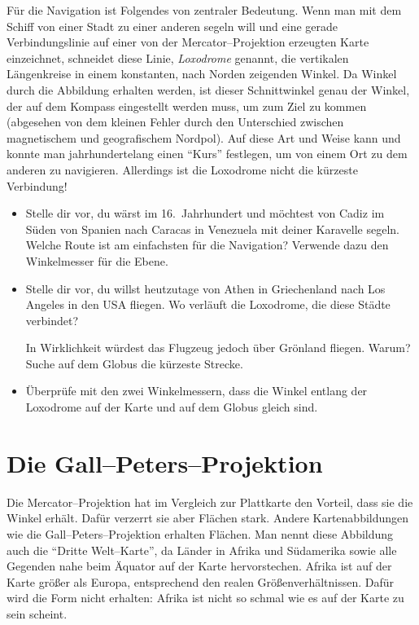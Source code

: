 \documentclass[a4paper,12pt]{article}
\begin{document}
Für die Navigation ist Folgendes von zentraler Bedeutung. Wenn man mit dem Schiff von 
einer Stadt zu einer anderen segeln will und eine gerade Verbindungslinie auf einer 
von der Mercator--Projektion erzeugten Karte einzeichnet, schneidet diese Linie, 
\emph{Loxodrome} genannt, die vertikalen Längenkreise in einem konstanten, nach Norden 
zeigenden Winkel. Da Winkel durch die Abbildung erhalten werden, ist dieser Schnittwinkel 
genau der Winkel, der auf dem Kompass eingestellt werden muss, um zum Ziel zu kommen
(abgesehen von dem kleinen Fehler durch den Unterschied zwischen magnetischem und 
geografischem Nordpol). Auf diese Art und Weise kann und konnte man jahrhundertelang 
einen "`Kurs"' festlegen, um von einem Ort zu dem anderen zu navigieren. Allerdings ist 
die Loxodrome nicht die kürzeste Verbindung!

\begin{itemize}
 \item Stelle dir vor, du wärst im 16.\ Jahrhundert und möchtest von Cadiz im Süden 
       von Spanien nach Caracas in Venezuela mit deiner Karavelle segeln. Welche 
       Route ist am einfachsten für die Navigation? Verwende dazu den Winkelmesser 
       für die Ebene.

 \item Stelle dir vor, du willst heutzutage von Athen in Griechenland nach Los Angeles 
       in den USA fliegen. Wo verläuft die Loxodrome, die diese Städte verbindet?

       In Wirklichkeit würdest das Flugzeug jedoch über Grönland fliegen. Warum? 
       Suche auf dem Globus die kürzeste Strecke.

 \item Überprüfe mit den zwei Winkelmessern, dass die Winkel entlang der Loxodrome 
       auf der Karte und auf dem Globus gleich sind.
\end{itemize}



\newpage
\section{Die Gall--Peters--Projektion}
\label{sec-gall}

Die Mercator--Projektion hat im Vergleich zur Plattkarte den Vorteil, dass sie die 
Winkel erhält. Dafür verzerrt sie aber Flächen stark. Andere Kartenabbildungen wie die
Gall--Peters--Projektion erhalten Flächen. Man nennt diese Abbildung auch die 
"`Dritte Welt--Karte"', da Länder in Afrika und Südamerika sowie alle Gegenden nahe 
beim Äquator auf der Karte hervorstechen. Afrika ist auf der Karte größer als Europa,
entsprechend den realen Größenverhältnissen. Dafür wird die Form nicht erhalten: Afrika
ist nicht so schmal wie es auf der Karte zu sein scheint.
\end{document}

